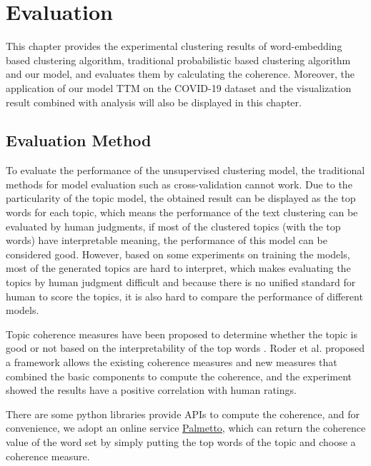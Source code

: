 \chapter{Evaluation}
\label{ch:evaluation}
This chapter provides the experimental clustering results of word-embedding based clustering algorithm, traditional probabilistic based clustering algorithm and our model, and evaluates them by calculating the coherence. Moreover, the application of our model TTM on the COVID-19 dataset and the visualization result combined with analysis will also be displayed in this chapter.


\section{Evaluation Method}
To evaluate the performance of the unsupervised clustering model, the traditional methods for model evaluation such as cross-validation cannot work. Due to the particularity of the topic model, the obtained result can be displayed as the top words for each topic, which means the performance of the text clustering can be evaluated by human judgments, if most of the clustered topics (with the top words) have interpretable meaning, the performance of this model can be considered good. However, based on some experiments on training the models, most of the generated topics are hard to interpret, which makes evaluating the topics by human judgment difficult and because there is no unified standard for human to score the topics, it is also hard to compare the performance of different models. 

Topic coherence measures have been proposed to determine whether the topic is good or not based on the interpretability of the top words \cite{mimno2011optimizing, newman2010automatic}. Roder et al. \cite{roder2015exploring} proposed a framework allows the existing coherence measures and new measures that combined the basic components to compute the coherence, and the experiment showed the results have a positive correlation with human ratings. 

There are some python libraries provide APIs to compute the coherence, and for convenience, we adopt an online service \href{https://palmetto.demos.dice-research.org}{Palmetto}, which can return the coherence value of the word set by simply putting the top words of the topic and choose a coherence measure.

